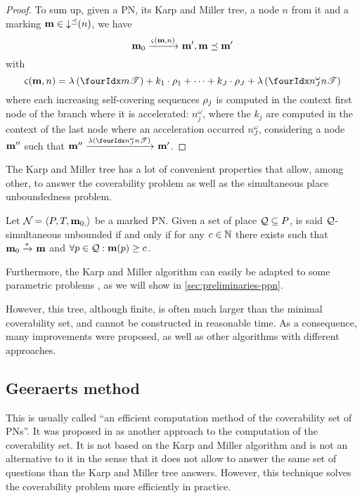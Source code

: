 \begin{proof}
  To sum up, given a \ac{PN}, its Karp and Miller tree, a node $n$ from it and a marking $\mathbf{m} \in \operatorname{\downarrow^\preceq}(n)$, we have
  \[
    \mathbf{m}_0 \xrightarrow{\operatorname{\varsigma}(\mathbf{m},n)}_{} \mathbf{m}', \mathbf{m} \preceq \mathbf{m}'
  \]
  with
  \[
    \tts{\mar}{n} = \labt{\treepath{m}} + k_1 \cdot \iscs{1} + \dots + k_J \cdot \iscs{J} + \labt{\treepath[n^\omega_J]{n}}
  \]
  where each increasing self-covering sequences $\iscs{j}$ is computed in the context first node of the branch where it is accelerated: $n^\omega_j$,
  where the $k_j$ are computed in the context of the last node where an acceleration occurred $n^\omega_J$, considering a node $\mathbf{m}''$ such that
  \( \mar'' \fire{\labt{\treepath[n^\omega_J]{n}}} \mar' \).

\end{proof}

The Karp and Miller tree has a lot of convenient properties that allow, among other, to answer the coverability problem as well as the simultaneous place unboundedness problem.

\begin{defi}
  Let $\mathcal{N}_{} = \left\langle P_{}, T_{}, \mathbf{m}_{0,}\right\rangle$ be a marked \ac{PN}.
  Given a set of place $\mathcal{Q} \subseteq P$, \namePN is said $\mathcal{Q}$-simultaneous unbounded if and only if for any $c \in \mathbb{N}$ there exists \mar such that $\mathbf{m}_0 \xrightarrow{*}_{} \mathbf{m}$ and $\forall p \in \mathcal{Q} : \mathbf{m}(p) \geq c$.
\end{defi}

Furthermore, the Karp and Miller algorithm can easily be adapted to some parametric problems \cite{David17}, as we will show in \autoref{sec:preliminaries-ppn}.

However, this tree, although finite, is often much larger than the minimal coverability set, and cannot be constructed in reasonable time.
As a consequence, many improvements were proposed, as well as other algorithms with different approaches.

\subsection{Geeraerts method}
\label{sec:eff}

This is usually called ``an efficient computation method of the coverability set of \acp{PN}''.
It was proposed in \cite{Geeraerts07thesis, Geeraerts07} as another approach to the computation of the coverability set.
It is not based on the Karp and Miller algorithm and is not an alternative to it in the sense that it does not allow to answer the same set of questions than the Karp and Miller tree answers.
However, this technique solves the coverability problem more efficiently in practice.

